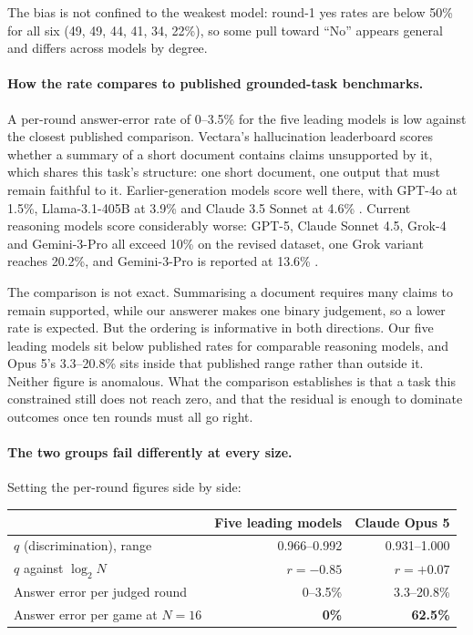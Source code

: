 \documentclass[11pt]{article}
\begin{document}
The bias is not confined to the weakest model: round-1 yes rates are below 50\%
for all six (49, 49, 44, 41, 34, 22\%), so some pull toward ``No'' appears
general and differs across models by degree.

\paragraph{How the rate compares to published grounded-task benchmarks.} A
per-round answer-error rate of 0--3.5\% for the five leading models is low
against the closest published comparison. Vectara's hallucination leaderboard
\citep{vectara2026} scores whether a summary of a short document contains claims
unsupported by it, which shares this task's structure: one short document, one
output that must remain faithful to it. Earlier-generation models score well
there, with GPT-4o at 1.5\%, Llama-3.1-405B at 3.9\% and Claude 3.5 Sonnet at
4.6\% \citep{bang2025hallulens}. Current reasoning models score considerably
worse: GPT-5, Claude Sonnet 4.5, Grok-4 and Gemini-3-Pro all exceed 10\% on the
revised dataset, one Grok variant reaches 20.2\%, and Gemini-3-Pro is reported
at 13.6\% \citep{vectara2026}.

The comparison is not exact. Summarising a document requires many claims to
remain supported, while our answerer makes one binary judgement, so a lower rate
is expected. But the ordering is informative in both directions. Our five
leading models sit below published rates for comparable reasoning models, and
Opus 5's 3.3--20.8\% sits inside that published range rather than outside it.
Neither figure is anomalous. What the comparison establishes is that a task this
constrained still does not reach zero, and that the residual is enough to
dominate outcomes once ten rounds must all go right.

\paragraph{The two groups fail differently at every size.} Setting the per-round
figures side by side:

\begin{center}\small
\begin{tabular}{lrr}
\toprule
& Five leading models & Claude Opus 5 \\
\midrule
$q$ (discrimination), range        & 0.966--0.992 & 0.931--1.000 \\
$q$ against $\log_2 N$             & $r=-0.85$    & $r=+0.07$ \\
Answer error per judged round      & 0--3.5\%     & 3.3--20.8\% \\
Answer error per game at $N{=}16$  & \textbf{0\%} & \textbf{62.5\%} \\
\bottomrule
\end{tabular}
\end{center}
\end{document}
